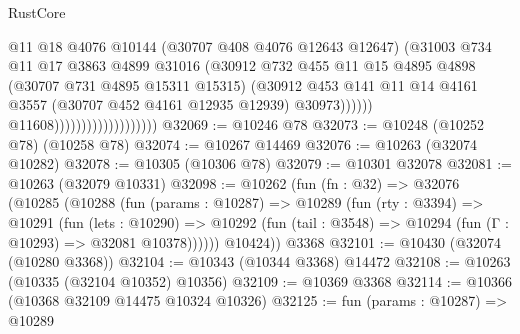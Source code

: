 \begin{lexlean}{RustCore}
\begin{coremodule}
                                                @11
                                                @18
                                                @4076
                                                @10144
                                                (@30707 @408 @4076 @12643 @12647)
                                                (@31003
                                                  @734
                                                  @11
                                                  @17
                                                  @3863
                                                  @4899
                                                  @31016
                                                  (@30912
                                                    @732
                                                    @455
                                                    @11
                                                    @15
                                                    @4895
                                                    @4898
                                                    (@30707 @731 @4895 @15311 @15315)
                                                    (@30912
                                                      @453
                                                      @141
                                                      @11
                                                      @14
                                                      @4161
                                                      @3557
                                                      (@30707 @452 @4161 @12935 @12939)
                                                      @30973))))))
                                          @11608)))))))))))))))))))
@32069 := @10246 @78
@32073 := @10248 (@10252 @78) (@10258 @78)
@32074 := @10267 @14469
@32076 := @10263 (@32074 @10282)
@32078 := @10305 (@10306 @78)
@32079 := @10301 @32078
@32081 := @10263 (@32079 @10331)
@32098 := @10262
    (fun (fn : @32) =>
    @32076
      (@10285
        (@10288
          (fun (params : @10287) =>
          @10289
            (fun (rty : @3394) =>
            @10291
              (fun (lets : @10290) =>
              @10292 (fun (tail : @3548) => @10294 (fun (Γ : @10293) => @32081 @10378))))))
        @10424))
    @3368
@32101 := @10430 (@32074 (@10280 @3368))
@32104 := @10343 (@10344 @3368) @14472
@32108 := @10263 (@10335 (@32104 @10352) @10356)
@32109 := @10369 @3368
@32114 := @10366 (@10368 @32109 @14475 @10324 @10326)
@32125 := fun (params : @10287) =>
  @10289

\end{coremodule}
\end{lexlean}
